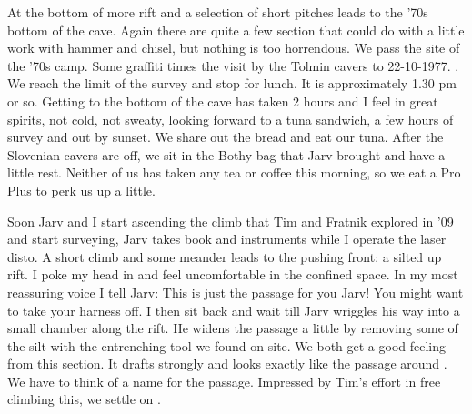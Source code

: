At the bottom of  more rift and
a selection of short pitches leads to the '70s bottom of the cave. Again
there are quite a few section that could do with a little work with
hammer and chisel, but nothing is too horrendous. We pass the site of
the '70s camp. Some graffiti times the visit by the Tolmin cavers to
22-10-1977. . We reach the limit of the survey and stop for lunch. It
is approximately 1.30 pm or so. Getting to the bottom of the cave has
taken 2 hours and I feel in great spirits, not cold, not sweaty, looking
forward to a tuna sandwich, a few hours of survey and out by sunset. We
share out the bread and eat our tuna. After the Slovenian cavers are
off, we sit in the Bothy bag that Jarv brought and have a little rest.
Neither of us has taken any tea or coffee this morning, so we eat a Pro
Plus to perk us up a little.

Soon Jarv and I start ascending the climb that Tim and Fratnik explored
in '09 and start surveying, Jarv takes book and instruments while I
operate the laser disto. A short climb and some meander leads to the
pushing front: a silted up rift. I poke my head in and feel
uncomfortable in the confined space. In my most reassuring voice I tell
Jarv: This is just the passage for you Jarv! You might want to take
your harness off. I then sit back and wait till Jarv wriggles his way
into a small chamber along the rift. He widens the passage a little by
removing some of the silt with the entrenching tool we found on site. We
both get a good feeling from this section. It drafts strongly and looks
exactly like the passage around . We have to think of a name
for the passage. Impressed by Tim's effort in free climbing this, we
settle on .


